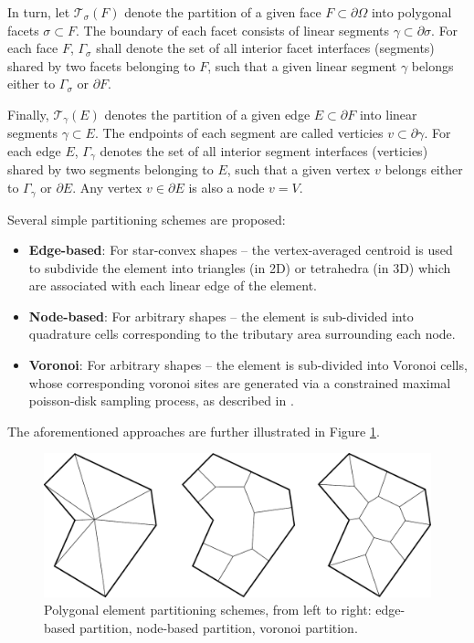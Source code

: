 	In turn, let $\mathcal{T}_{\sigma} (F)$ denote the partition of a given face $F \subset \partial \Omega$ into polygonal facets $\sigma \subset F$. The boundary of each facet consists of linear segments $\gamma \subset \partial \sigma$. For each face $F$, $\Gamma_\sigma$ shall denote the set of all interior facet interfaces (segments) shared by two facets belonging to $F$, such that a given linear segment $\gamma$ belongs either to $\Gamma_\sigma$ or $\partial F$.
	
	Finally, $\mathcal{T}_{\gamma} (E)$ denotes the partition of a given edge $E \subset \partial F$ into linear segments $\gamma \subset E$. The endpoints of each segment are called verticies $v \subset \partial \gamma$. For each edge $E$, $\Gamma_\gamma$ denotes the set of all interior segment interfaces (verticies) shared by two segments belonging to $E$, such that a given vertex $v$ belongs either to $\Gamma_\gamma$ or $\partial E$. Any vertex $v \in \partial E$ is also a node $v = V$.
	
	Several simple partitioning schemes are proposed:
	\begin{itemize}
		\item \textbf{Edge-based}: For star-convex shapes -- the vertex-averaged centroid is used to subdivide the element into triangles (in 2D) or tetrahedra (in 3D) which are associated with each linear edge of the element.
		\item \textbf{Node-based}: For arbitrary shapes -- the element is sub-divided into quadrature cells corresponding to the tributary area surrounding each node.
		\item \textbf{Voronoi}: For arbitrary shapes -- the element is sub-divided into Voronoi cells, whose corresponding voronoi sites are generated via a constrained maximal poisson-disk sampling process, as described in \cite{Ebeida:11}.
	\end{itemize}
	The aforementioned approaches are further illustrated in Figure \ref{fig:partitioning_types}.
	\begin{figure} [!ht]
		\centering
		\includegraphics[width = 6.0in]{figures/partition_types.pdf}
		\caption{Polygonal element partitioning schemes, from left to right: edge-based partition, node-based partition, voronoi partition.}
		\label{fig:partitioning_types}
	\end{figure}
	
